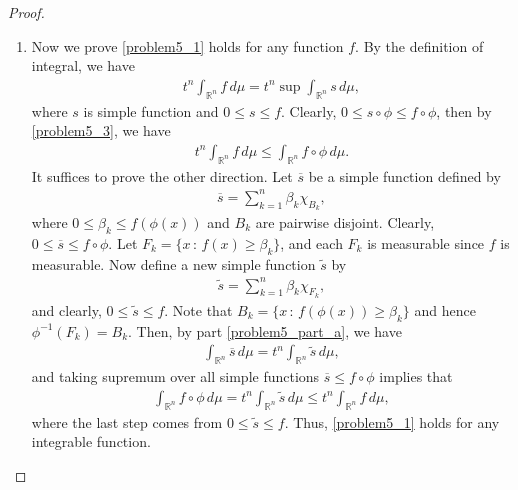 \documentclass[11pt]{book}
\theoremstyle{definition}
\numberwithin{equation}{chapter}
\begin{document}
\begin{proof}
\begin{enumerate}[label=(\alph*)]
    \item Now we prove \eqref{problem5_1} holds for any function $f$. By the definition of integral, we have
    \begin{align}\label{problem5_3}
        t^n \int_{\mathbb{R}^n} f\,d\mu = t^n \sup \int_{\mathbb{R}^n} s\,d\mu,
    \end{align}
    where $s$ is simple function and $0 \leq s \leq f$. Clearly, $0 \leq s \circ \phi \leq f \circ \phi$, then by \eqref{problem5_3}, we have
    \begin{align*}
        t^n \int_{\mathbb{R}^n} f\,d\mu \leq \int_{\mathbb{R}^n} f \circ \phi \,d\mu.
    \end{align*}
    It suffices to prove the other direction. Let $\overline{s}$ be a simple function defined by
    \begin{align*}
        \overline{s} = \sum^n_{k=1} \beta_k \chi_{B_k},
    \end{align*}
    where $0 \leq \beta_k \leq f(\phi(x))$ and $B_k$ are pairwise disjoint. Clearly, $0 \leq \overline{s} \leq f \circ \phi$. Let $F_k = \{x \,:\, f(x) \geq \beta_k\}$, and each $F_k$ is measurable since $f$ is measurable. Now define a new simple function $\widetilde{s}$ by
    \begin{align*}
        \widetilde{s} = \sum^n_{k=1} \beta_k \chi_{F_k},
    \end{align*}
    and clearly, $0 \leq \widetilde{s} \leq f$. Note that $B_k = \{x \,:\, f(\phi(x)) \geq \beta_k\}$ and hence $\phi^{-1}(F_k) = B_k$. Then, by part \ref{problem5_part_a}, we have
    \begin{align*}
        \int_{\mathbb{R}^n} \overline{s}\,d\mu = t^n \int_{\mathbb{R}^n} \widetilde{s} \,d\mu,
    \end{align*}
    and taking supremum over all simple functions $\overline{s} \leq f \circ \phi$ implies that
    \begin{align*}
        \int_{\mathbb{R}^n} f \circ \phi \,d\mu = t^n \int_{\mathbb{R}^n} \widetilde{s} \,d\mu \leq t^n \int_{\mathbb{R}^n} f\,d\mu,
    \end{align*}
    where the last step comes from $0 \leq \widetilde{s} \leq f$. Thus, \eqref{problem5_1} holds for any integrable function.%
\end{enumerate}

\end{proof}
\end{document}
